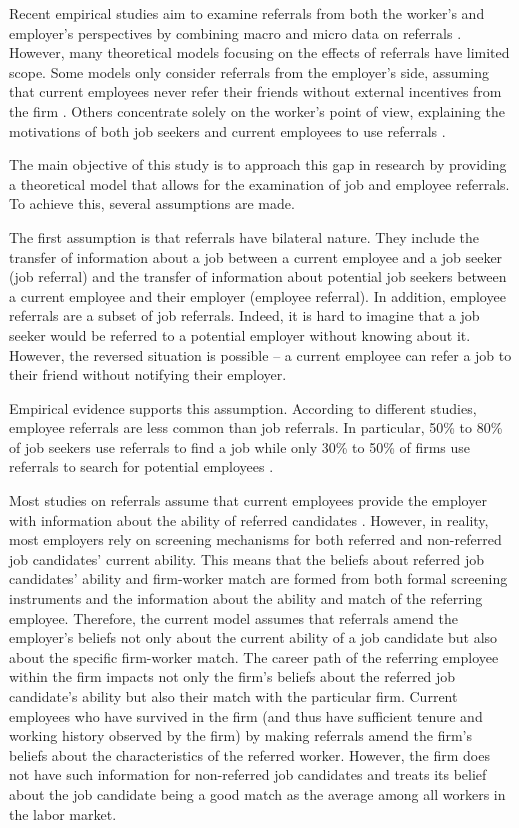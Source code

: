 \documentclass[12pt]{article}
\begin{document}
Recent empirical studies aim to examine referrals from both the worker's and employer's perspectives by combining macro and micro data on referrals \citep{levati2020impact, lester2021heterogeneous}. However, many theoretical models focusing on the effects of referrals have limited scope. Some models only consider referrals from the employer's side, assuming that current employees never refer their friends without external incentives from the firm \citep{ekinci2016employee}. Others concentrate solely on the worker's point of view, explaining the motivations of both job seekers and current employees to use referrals \citep{lester2021heterogeneous}.

The main objective of this study is to approach this gap in research by providing a theoretical model that allows for the examination of job and employee referrals. To achieve this, several assumptions are made. 

The first assumption is that referrals have bilateral nature. They include the transfer of information about a job between a current employee and a job seeker (job referral) and the transfer of information about potential job seekers between a current employee and their employer (employee referral). In addition, employee referrals are a subset of job referrals. Indeed, it is hard to imagine that a job seeker would be referred to a potential employer without knowing about it. However, the reversed situation is possible – a current employee can refer a job to their friend without notifying their employer. 

Empirical evidence supports this assumption. According to different studies, employee referrals are less common than job referrals. In particular,  50\% to 80\% of job seekers use referrals to find a job  \citep{lin1981social, elliott1999social} while only 30\% to 50\% of firms use referrals to search for potential employees \citep{neckerman1991hiring, holzer1987hiring}.

Most studies on referrals assume that current employees provide the employer with information about the ability of referred candidates \citep{lester2021heterogeneous, ekinci2016employee, beaman2012gets}. However, in reality, most employers rely on screening mechanisms for both referred and non-referred job candidates' current ability. This means that the beliefs about referred job candidates' ability and firm-worker match are formed from both formal screening instruments and the information about the ability and match of the referring employee. Therefore, the current model assumes that referrals amend the employer's beliefs not only about the current ability of a job candidate but also about the specific firm-worker match. The career path of the referring employee within the firm impacts not only the firm's beliefs about the referred job candidate's ability but also their match with the particular firm. Current employees who have survived in the firm (and thus have sufficient tenure and working history observed by the firm) by making referrals amend the firm's beliefs about the characteristics of the referred worker. However, the firm does not have such information for non-referred job candidates and treats its belief about the job candidate being a good match as the average among all workers in the labor market.
\end{document}
